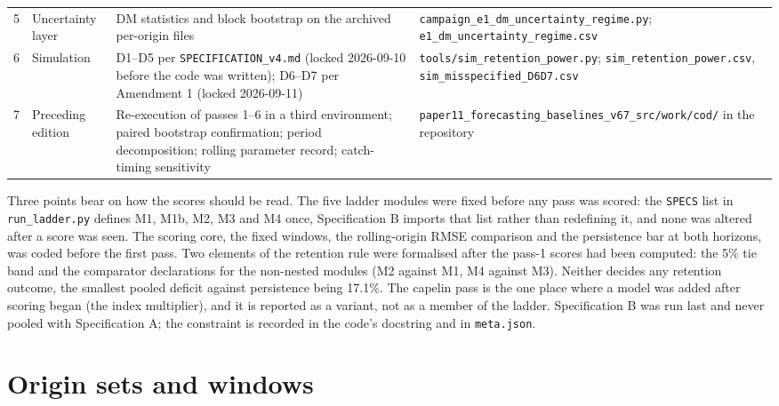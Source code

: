 \documentclass[preprint,11pt,authoryear]{elsarticle}
\theoremstyle{remark}
\begin{document}
\begin{table}[!htb]
\begin{tabularx}{\textwidth}{@{}clLL@{}}
5 & Uncertainty layer & DM statistics and block bootstrap on the archived per-origin files & \texttt{campaign\_\allowbreak{}e1\_\allowbreak{}dm\_\allowbreak{}uncertainty\_\allowbreak{}regime.py}; \texttt{e1\_\allowbreak{}dm\_\allowbreak{}uncertainty\_\allowbreak{}regime.csv} \\
6 & Simulation & D1--D5 per \texttt{SPECIFICATION\_\allowbreak{}v4.md} (locked 2026-09-10 before the code was written); D6--D7 per Amendment 1 (locked 2026-09-11) & \texttt{tools/\allowbreak{}sim\_\allowbreak{}retention\_\allowbreak{}power.py}; \texttt{sim\_\allowbreak{}retention\_\allowbreak{}power.csv}, \texttt{sim\_\allowbreak{}misspecified\_\allowbreak{}D6D7.csv} \\
7 & Preceding edition & Re-execution of passes 1--6 in a third environment; paired bootstrap confirmation; period decomposition; rolling parameter record; catch-timing sensitivity & \texttt{paper11\_\allowbreak{}forecasting\_\allowbreak{}baselines\_\allowbreak{}v67\_\allowbreak{}src/\allowbreak{}work/\allowbreak{}cod/\allowbreak{}} in the repository \\
\bottomrule
\end{tabularx}
\end{table}

Three points bear on how the scores should be read. The five ladder modules were fixed before any pass was scored: the \texttt{SPECS} list in \texttt{run\_ladder.py} defines M1, M1b, M2, M3 and M4 once, Specification B imports that list rather than redefining it, and none was altered after a score was seen. The scoring core, the fixed windows, the rolling-origin RMSE comparison and the persistence bar at both horizons, was coded before the first pass. Two elements of the retention rule were formalised after the pass-1 scores had been computed: the 5\% tie band and the comparator declarations for the non-nested modules (M2 against M1, M4 against M3). Neither decides any retention outcome, the smallest pooled deficit against persistence being 17.1\%. The capelin pass is the one place where a model was added after scoring began (the index multiplier), and it is reported as a variant, not as a member of the ladder. Specification B was run last and never pooled with Specification A; the constraint is recorded in the code's docstring and in \texttt{meta.json}.

\section{Origin sets and windows}\label{si:origins}
\end{document}
